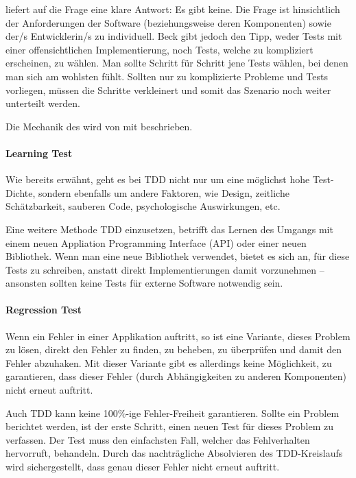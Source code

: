 \cite[134]{Beck:2003} liefert auf die Frage  eine klare Antwort: Es gibt keine.
Die Frage ist hinsichtlich der Anforderungen der Software (beziehungsweise deren Komponenten) sowie der/s Entwicklerin/s zu individuell.
Beck gibt jedoch den Tipp, weder Tests mit einer offensichtlichen Implementierung, noch Tests, welche zu kompliziert erscheinen, zu wählen. Man sollte Schritt für Schritt jene Tests wählen, bei denen man sich am wohlsten fühlt. Sollten nur zu komplizierte Probleme und Tests vorliegen, müssen die Schritte verkleinert und somit das Szenario noch weiter unterteilt werden.

Die Mechanik des  wird von \cite[134]{Beck:2003} mit  beschrieben.

\paragraph{Learning Test}

Wie bereits erwähnt, geht es bei TDD nicht nur um eine möglichst hohe Test-Dichte, sondern ebenfalls um andere Faktoren, wie Design, zeitliche Schätzbarkeit, sauberen Code, psychologische Auswirkungen, etc.

Eine weitere Methode TDD einzusetzen, betrifft das Lernen des Umgangs mit einem neuen Appliation Programming Interface (API) oder einer neuen Bibliothek. Wenn man eine neue Bibliothek verwendet, bietet es sich an, für diese Tests zu schreiben, anstatt direkt Implementierungen damit vorzunehmen -- ansonsten sollten keine Tests für externe Software notwendig sein.

\paragraph{Regression Test}
Wenn ein Fehler in einer Applikation auftritt, so ist eine Variante, dieses Problem zu lösen, direkt den Fehler zu finden, zu beheben, zu überprüfen und damit den Fehler abzuhaken. Mit dieser Variante gibt es allerdings keine Möglichkeit, zu garantieren, dass dieser Fehler (durch Abhängigkeiten zu anderen Komponenten) nicht erneut auftritt.

Auch TDD kann keine 100\%-ige Fehler-Freiheit garantieren. Sollte ein Problem berichtet werden, ist der erste Schritt, einen neuen Test für dieses Problem zu verfassen. Der Test muss den einfachsten Fall, welcher das Fehlverhalten hervorruft, behandeln. Durch das nachträgliche Absolvieren des TDD-Kreislaufs wird sichergestellt, dass genau dieser Fehler nicht erneut auftritt.

